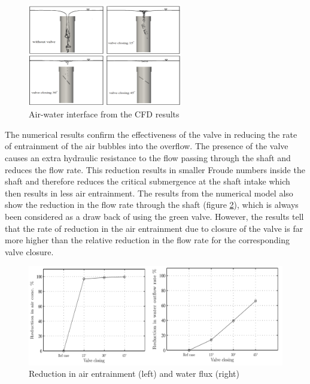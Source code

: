 \begin{figure}[ht!]
    \centering
    \includegraphics[width =0.6\textwidth]{Images/Env_valve_1.png}
    \caption{Air-water interface from the CFD results}
    \label{fig:Env_valve_1}
\end{figure}

\noindent The numerical results confirm the effectiveness of the valve in reducing the rate of entrainment of the air bubbles into the overflow. The presence of the valve causes an extra hydraulic resistance to the flow passing through the shaft and reduces the flow rate. This reduction results in smaller Froude numbers inside the shaft and therefore reduces the critical submergence at the shaft intake which then results in less air entrainment. \newline
The results from the numerical model also show the reduction in the flow rate through the shaft (figure \ref{fig:Env_valve_2}), which is always been considered as a draw back of using the green valve. However, the results tell that the rate of reduction in the air entrainment due to closure of the valve is far more higher than the relative reduction in the flow rate for the corresponding valve closure.

\begin{figure}[ht!]
    \centering
    \includegraphics[width =1\textwidth]{Images/Env_valve_2.png}
    \caption{Reduction in air entrainment (left) and water flux (right)}
    \label{fig:Env_valve_2}
\end{figure}

